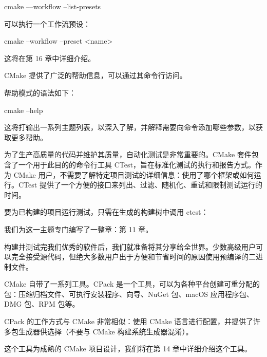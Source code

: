 \begin{shell}
cmake ––workflow --list-presets
\end{shell}

可以执行一个工作流预设：

\begin{shell}
cmake --workflow --preset <name>
\end{shell}

这将在第 16 章中详细介绍。


CMake 提供了广泛的帮助信息，可以通过其命令行访问。

帮助模式的语法如下：

\begin{shell}
cmake --help
\end{shell}

这将打输出一系列主题列表，以深入了解，并解释需要向命令添加哪些参数，以获取更多帮助。


为了生产高质量的代码并维护其质量，自动化测试是非常重要的。CMake 套件包含了一个用于此目的的命令行工具 CTest，旨在标准化测试的执行和报告方式。作为 CMake 用户，不需要了解特定项目测试的详细信息：使用了哪个框架或如何运行。CTest 提供了一个方便的接口来列出、过滤、随机化、重试和限制测试运行的时间。

要为已构建的项目运行测试，只需在生成的构建树中调用 ctest：


我们为这一主题专门编写了一整章：第 11 章。


构建并测试完我们优秀的软件后，我们就准备将其分享给全世界。少数高级用户可以完全接受源代码，但绝大多数用户出于方便和节省时间的原因使用预编译的二进制文件。

CMake 自带了一系列工具。CPack 是一个工具，可以为各种平台创建可重分配的包：压缩归档文件、可执行安装程序、向导、NuGet 包、macOS 应用程序包、DMG 包、RPM 包等。

CPack 的工作方式与 CMake 非常相似：使用 CMake 语言进行配置，并提供了许多包生成器供选择（不要与 CMake 构建系统生成器混淆）。

这个工具为成熟的 CMake 项目设计，我们将在第 14 章中详细介绍这个工具。

